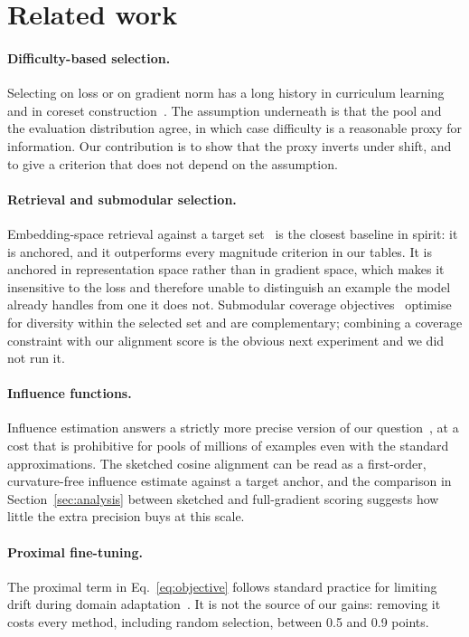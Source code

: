 \section{Related work}
\label{sec:related}

\paragraph{Difficulty-based selection.}
Selecting on loss or on gradient norm has a long history in curriculum learning
and in coreset construction~\citep{arbogast2021gradnorm,vasquez2019curriculum}.
The assumption underneath is that the pool and the evaluation distribution
agree, in which case difficulty is a reasonable proxy for information. Our
contribution is to show that the proxy inverts under shift, and to give a
criterion that does not depend on the assumption.

\paragraph{Retrieval and submodular selection.}
Embedding-space retrieval against a target set~\citep{iwasaki2022retrieval} is
the closest baseline in spirit: it is anchored, and it outperforms every
magnitude criterion in our tables. It is anchored in representation space
rather than in gradient space, which makes it insensitive to the loss and
therefore unable to distinguish an example the model already handles from one
it does not. Submodular coverage
objectives~\citep{delacroix2020submodular,penrose2021coverage} optimise for
diversity within the selected set and are complementary; combining a coverage
constraint with our alignment score is the obvious next experiment and we did
not run it.

\paragraph{Influence functions.}
Influence estimation answers a strictly more precise version of our
question~\citep{marchetti2020influence}, at a cost that is prohibitive for
pools of millions of examples even with the standard approximations. The
sketched cosine alignment can be read as a first-order, curvature-free
influence estimate against a target anchor, and the comparison in
Section~\ref{sec:analysis} between sketched and full-gradient scoring suggests
how little the extra precision buys at this scale.

\paragraph{Proximal fine-tuning.}
The proximal term in Eq.~\eqref{eq:objective} follows standard practice for
limiting drift during domain adaptation~\citep{halvorsen2023proximal}. It is
not the source of our gains: removing it costs every method, including random
selection, between 0.5 and 0.9 points.
